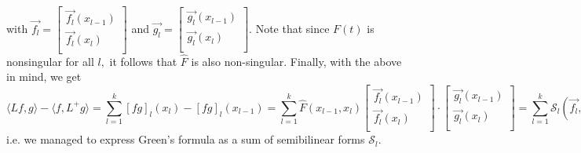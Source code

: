 \documentclass[11pt,reqno,oneside,a4paper]{article}
\theoremstyle{plain} %
\theoremstyle{definition}
\theoremstyle{remark}
\begin{document}
with $\vec{f_l} = \begin{bmatrix}
\vec{f_l}(x_{l-1})  \\
\vec{f_l}(x_{l})  \\
\end{bmatrix}$ and $\vec{g_l} = \begin{bmatrix}
\vec{g_l}(x_{l-1})  \\
\vec{g_l}(x_{l})  \\
\end{bmatrix}.$
Note that since $F(t)$ is nonsingular for all $l,$ it follows that $\widehat{F}$ is also non-singular. Finally, with the above in mind, we get
\[ 
 \langle Lf,g\rangle - \langle f,L^+ g\rangle = \sum_{l=1}^{k} [fg]_l(x_l) - [fg]_l(x_{l-1}) =  \sum_{l=1}^{k} \widehat{F}(x_{l-1}, x_l)  
\begin{bmatrix}
\vec{f_l}(x_{l-1})  \\
\vec{f_l}(x_{l})  \\
\end{bmatrix}
\cdot
\begin{bmatrix}
\vec{g_l}(x_{l-1})  \\
\vec{g_l}(x_{l})  \\
\end{bmatrix} =
\sum_{l=1}^{k}  \mathcal{S}_l (\vec{f_l}, \vec{g_l}),
\]
i.e. we managed to express Green's formula as a sum of semibilinear forms $\mathcal{S}_l.$
\end{document}
